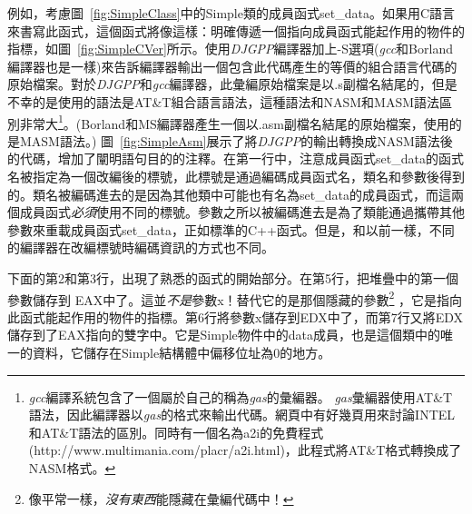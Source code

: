 例如，考慮圖~\ref{fig:SimpleClass}中的{\code Simple}類的成員函式{\code set\_data}。如果用C語言來書寫此函式，這個函式將像這樣：明確傳遞一個指向成員函式能起作用的物件的指標，如圖~\ref{fig:SimpleCVer}所示。使用\emph{DJGPP}編譯器加上{\code -S}選項(\emph{gcc}和Borland編譯器也是一樣)來告訴編譯器輸出一個包含此代碼產生的等價的組合語言代碼的原始檔案。對於\emph{DJGPP}和\emph{gcc}編譯器，此彙編原始檔案是以{\code .s}副檔名結尾的，但是不幸的是使用的語法是AT\&T組合語言語法，這種語法和NASM和MASM語法區別非常大\footnote{\emph{gcc}編譯系統包含了一個屬於自己的稱為\emph{gas}的彙編器。
\emph{gas}彙編器使用AT\&T語法，因此編譯器以\emph{gas}的格式來輸出代碼。網頁中有好幾頁用來討論INTEL和AT\&T語法的區別。同時有一個名為{\code a2i}的免費程式
({http://www.multimania.com/placr/a2i.html})，此程式將AT\&T格式轉換成了NASM格式。}。(Borland和MS編譯器產生一個以{\code .asm}副檔名結尾的原始檔案，使用的是MASM語法。)
圖~\ref{fig:SimpleAsm}展示了將\emph{DJGPP}的輸出轉換成NASM語法後的代碼，增加了闡明語句目的的注釋。在第一行中，注意成員函式{\code set\_data}的函式名被指定為一個改編後的標號，此標號是通過編碼成員函式名，類名和參數後得到的。類名被編碼進去的是因為其他類中可能也有名為{\code set\_data}的成員函式，而這兩個成員函式\emph{必須}使用不同的標號。參數之所以被編碼進去是為了類能通過攜帶其他參數來重載成員函式{\code set\_data}，正如標準的C++函式。但是，和以前一樣，不同的編譯器在改編標號時編碼資訊的方式也不同。

下面的第2和第3行，出現了熟悉的函式的開始部分。在第5行，把堆疊中的第一個參數儲存到{\code
EAX}中了。這並\emph{不是}參數{\code x}！替代它的是那個隱藏的參數\footnote{像平常一樣，\emph{沒有東西}能隱藏在彙編代碼中！} ，它是指向此函式能起作用的物件的指標。第6行將參數{\code x}儲存到{\code EDX}中了，而第7行又將{\code EDX}儲存到了{\code EAX}指向的雙字中。它是{\code Simple}物件中的{\code data}成員，也是這個類中的唯一的資料，它儲存在{\code Simple}結構體中偏移位址為0的地方。

